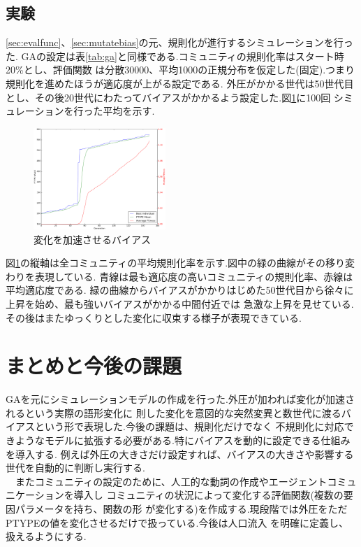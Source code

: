 \documentclass[10.5pt, a4j, twocolumn]{jsarticle}
\begin{document}
\subsection{実験}
\ref{sec:evalfunc}、\ref{sec:mutatebias}の元、規則化が進行するシミュレーションを行った.
GAの設定は表\ref{tab:ga}と同様である.コミュニティの規則化率はスタート時20\%とし、評価関数
は分散30000、平均1000の正規分布を仮定した(固定).つまり規則化を進めたほうが適応度が上がる設定である.
外圧がかかる世代は50世代目とし、その後20世代にわたってバイアスがかかるよう設定した.図\ref{fig:result}に100回
シミュレーションを行った平均を示す.
\begin{figure}[htbp]
 \centering
 \includegraphics[width=5cm]{result.eps}
 \caption{変化を加速させるバイアス\label{fig:result}}
\end{figure}

図\ref{fig:result}の縦軸は全コミュニティの平均規則化率を示す.図中の緑の曲線がその移り変わりを表現している.
青線は最も適応度の高いコミュニティの規則化率、赤線は平均適応度である.
緑の曲線からバイアスがかかりはじめた50世代目から徐々に上昇を始め、最も強いバイアスがかかる中間付近では
急激な上昇を見せている.その後はまたゆっくりとした変化に収束する様子が表現できている.

\section{まとめと今後の課題}
GAを元にシミュレーションモデルの作成を行った.外圧が加われば変化が加速されるという実際の語形変化に
則した変化を意図的な突然変異と数世代に渡るバイアスという形で表現した.今後の課題は、規則化だけでなく
不規則化に対応できようなモデルに拡張する必要がある.特にバイアスを動的に設定できる仕組みを導入する.
例えば外圧の大きさだけ設定すれば、バイアスの大きさや影響する世代を自動的に判断し実行する.\\
　またコミュニティの設定のために、人工的な動詞の作成やエージェントコミュニケーションを導入し
コミュニティの状況によって変化する評価関数(複数の要因パラメータを持ち、関数の形
が変化する)を作成する.現段階では外圧をただPTYPEの値を変化させるだけで扱っている.今後は人口流入
を明確に定義し、扱えるようにする.
\end{document}
